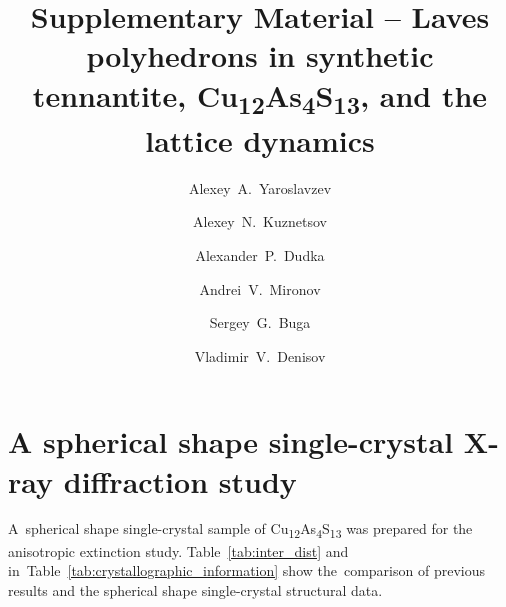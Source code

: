 \documentclass[preprint,review,12pt]{elsarticle}
\begin{document}
\begin{frontmatter}



\title{Supplementary Material \--- Laves polyhedrons in synthetic tennantite, Cu\textsubscript{12}As\textsubscript{4}S\textsubscript{13}, and the lattice dynamics}

\author[TISNCM]{Alexey~A.~Yaroslavzev}
\author[MSU,ICRAS]{Alexey~N.~Kuznetsov}
\author[SIC]{Alexander~P.~Dudka}
\author[MSU]{Andrei~V.~Mironov}
\author[MIPT,TISNCM]{Sergey~G.~Buga}
\author[TISNCM]{Vladimir~V.~Denisov}

\address[TISNCM]{Technological Institute for Superhard and Novel Carbon Materials, 108840, Troitsk, Moscow, Russia}
\address[MSU]{Department of Chemistry, Lomonosov Moscow State University, 119991, Moscow, Russia}
\address[ICRAS]{Kurnakov Institute of General and Inorganic Chemistry RAS, 119991, Moscow, Russia}
\address[SIC]{Shubnikov Institute of Crystallography of Federal Scientific Research Centre “Crystallography and Photonics” of Russian Academy of Sciences, Leninskiy Prospekt 59, 119333, Moscow, Russia}
\address[MIPT]{Moscow Institute of Physics and Technology, 141700, 9 Institutsky lane, Dolgoprudny, Russia}


\end{frontmatter}


\section{A spherical shape single-crystal X-ray diffraction study}\label{sec:level1}

A~spherical shape single-crystal sample of Cu\textsubscript{12}As\textsubscript{4}S\textsubscript{13}  was prepared for the anisotropic extinction study.
Table~\ref{tab:inter_dist} and in~Table~\ref{tab:crystallographic_information} show the~comparison of previous results\cite{yaroslavzev2019} and the spherical shape single-crystal structural data.
\end{document}
